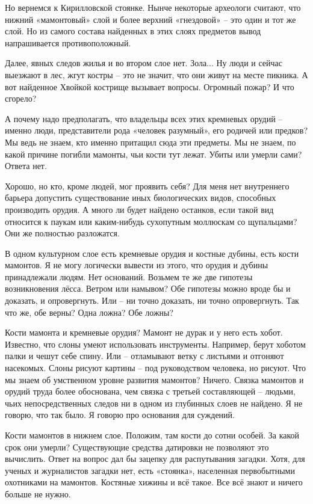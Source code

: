 Но вернемся к Кирилловской стоянке. Нынче некоторые археологи считают, что нижний «мамонтовый» слой и более верхний «гнездовой» – это один и тот же слой. Но из самого состава найденных в этих слоях предметов вывод напрашивается противоположный.

Далее, явных следов жилья и во втором слое нет. Зола... Ну люди и сейчас выезжают в лес, жгут костры – это не значит, что они живут на месте пикника. А вот найденное Хвойкой кострище вызывает вопросы. Огромный пожар? И что сгорело?

А почему надо предполагать, что владельцы всех этих кремневых орудий – именно люди, представители рода «человек разумный», его родичей или предков? Мы ведь не знаем, кто именно притащил сюда эти предметы. Мы не знаем, по какой причине погибли мамонты, чьи кости тут лежат. Убиты или умерли сами? Ответа нет.

Хорошо, но кто, кроме людей, мог проявить себя? Для меня нет внутреннего барьера допустить существование иных биологических видов, способных производить орудия. А много ли будет найдено останков, если такой вид относится к паукам или каким-нибудь сухопутным моллюскам со щупальцами? Они же полностью разложатся.

В одном культурном слое есть кремневые орудия и костные дубины, есть кости мамонтов. Я не могу логически вывести из этого, что орудия и дубины принадлежали людям. Нет оснований. Возьмем те же две гипотезы возникновения лёсса. Ветром или намывом? Обе гипотезы можно вроде бы и доказать, и опровергнуть. Или – ни точно доказать, ни точно опровергнуть. Так что же, обе верны? Одна ложна? Обе ложны? 

Кости мамонта и кремневые орудия? Мамонт не дурак и у него есть хобот. Известно, что слоны умеют использовать инструменты. Например, берут хоботом палки и чешут себе спину. Или – отламывают ветку с листьями и отгоняют насекомых. Слоны рисуют картины – под руководством человека, но рисуют. Что мы знаем об умственном уровне развития мамонтов? Ничего. Связка мамонтов и орудий труда более обоснована, чем связка с третьей составляющей – людьми, чьих непосредственных следов ни в одном из глубинных слоев не найдено. Я не говорю, что так было. Я говорю про основания для суждений.

Кости мамонтов в нижнем слое. Положим, там кости до сотни особей. За какой срок они умерли? Существующие средства датировки не позволяют это вычислить. Ответ на вопрос дал бы зацепку для распутывания загадки. Хотя, для ученых и журналистов загадки нет, есть «стоянка», населенная первобытными охотниками на мамонтов. Костяные хижины и всё такое. Все всё знают и ничего больше не нужно.

